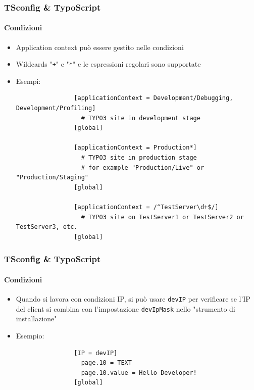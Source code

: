 \begin{frame}[fragile]
	\frametitle{TSconfig \& TypoScript}
	\framesubtitle{Condizioni}

	\begin{itemize}
		\item Application context può essere gestito nelle condizioni
		\item Wildcards "\texttt{+}" e "\texttt{*}" e le espressioni regolari sono supportate
		\item Esempi:

			\lstset{
				basicstyle=\tiny\ttfamily
			}

			\begin{lstlisting}
				[applicationContext = Development/Debugging, Development/Profiling]
				  # TYPO3 site in development stage
				[global]

				[applicationContext = Production*]
				  # TYPO3 site in production stage
				  # for example "Production/Live" or "Production/Staging"
				[global]

				[applicationContext = /^TestServer\d+$/]
				  # TYPO3 site on TestServer1 or TestServer2 or TestServer3, etc.
				[global]
			\end{lstlisting}

	\end{itemize}

\end{frame}


\begin{frame}[fragile]
	\frametitle{TSconfig \& TypoScript}
	\framesubtitle{Condizioni}

	\begin{itemize}

		\item Quando si lavora con condizioni IP, si può usare \texttt{devIP} per verificare se l'IP del client si combina con l'impostazione \texttt{devIpMask} nello "strumento di installazione"
		\item Esempio:


			\begin{lstlisting}
				[IP = devIP]
				  page.10 = TEXT
				  page.10.value = Hello Developer!
				[global]
			\end{lstlisting}

	\end{itemize}

\end{frame}

